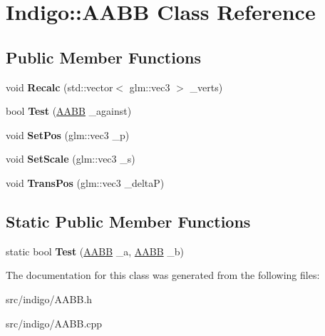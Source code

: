 \hypertarget{class_indigo_1_1_a_a_b_b}{}\section{Indigo\+:\+:A\+A\+BB Class Reference}
\label{class_indigo_1_1_a_a_b_b}
\subsection*{Public Member Functions}
\begin{DoxyCompactItemize}
\item 
\mbox{\label{class_indigo_1_1_a_a_b_b_abe28ace359bf4c795549f66003277d98}} 
void {\bfseries Recalc} (std\+::vector$<$ glm\+::vec3 $>$ \+\_\+verts)
\item 
\mbox{\label{class_indigo_1_1_a_a_b_b_ad26af46e6323558ba5afd0a1a0ece39c}} 
bool {\bfseries Test} (\hyperlink{class_indigo_1_1_a_a_b_b}{A\+A\+BB} \+\_\+against)
\item 
\mbox{\label{class_indigo_1_1_a_a_b_b_a2e2aa4edcee8d263377f29f0bb4b5c48}} 
void {\bfseries Set\+Pos} (glm\+::vec3 \+\_\+p)
\item 
\mbox{\label{class_indigo_1_1_a_a_b_b_a10b634ba4b56cea6f7e23600f2038399}} 
void {\bfseries Set\+Scale} (glm\+::vec3 \+\_\+s)
\item 
\mbox{\label{class_indigo_1_1_a_a_b_b_a8f012190d6a7dfad085eaf62cb4e084a}} 
void {\bfseries Trans\+Pos} (glm\+::vec3 \+\_\+deltaP)
\end{DoxyCompactItemize}
\subsection*{Static Public Member Functions}
\begin{DoxyCompactItemize}
\item 
\mbox{\label{class_indigo_1_1_a_a_b_b_ae37c74a1e633929b06b6cab1fa678451}} 
static bool {\bfseries Test} (\hyperlink{class_indigo_1_1_a_a_b_b}{A\+A\+BB} \+\_\+a, \hyperlink{class_indigo_1_1_a_a_b_b}{A\+A\+BB} \+\_\+b)
\end{DoxyCompactItemize}


The documentation for this class was generated from the following files\+:\begin{DoxyCompactItemize}
\item 
src/indigo/A\+A\+B\+B.\+h\item 
src/indigo/A\+A\+B\+B.\+cpp\end{DoxyCompactItemize}
